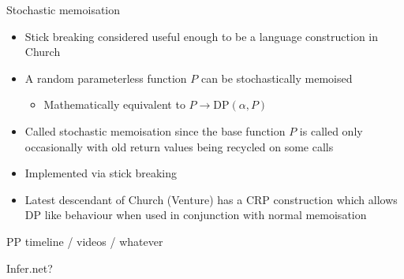 \begin{frame}{Stochastic memoisation}
  \begin{itemize}
    \item Stick breaking considered useful enough to be a language construction  in Church
    \vspace{\baselineskip}
    \item A random parameterless function $P$ can be stochastically memoised
    \begin{itemize}
      \item Mathematically equivalent to $P \to \textrm{DP}(\alpha, P)$
    \end{itemize}
    \vspace{\baselineskip}
    \item Called stochastic memoisation since the base function $P$ is called only occasionally with old return values being recycled on some calls
    \vspace{\baselineskip}
    \item Implemented via stick breaking 
    \vspace{\baselineskip}
    \item Latest descendant of Church (Venture) has a CRP construction which allows DP like behaviour when used in conjunction with normal memoisation
  \end{itemize}
\end{frame}

\begin{frame}{PP timeline / videos / whatever}

Infer.net?
\end{frame}


